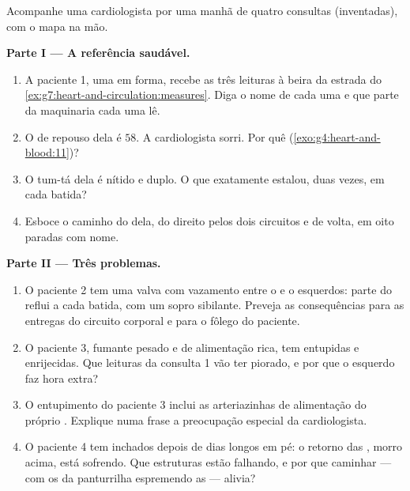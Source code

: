 \begin{problem}\label{pb:g7:heart-and-circulation:1}
Acompanhe uma cardiologista por uma manhã de quatro consultas
(inventadas), com o mapa na mão.

\medskip\noindent\textbf{Parte I --- A referência
saudável.}
\begin{enumerate}
  \item A paciente 1, uma  em forma, recebe as três
        leituras à beira da estrada do
        \cref{ex:g7:heart-and-circulation:measures}. Diga o nome de
        cada uma e que parte da maquinaria cada uma lê.
  \item O  de repouso dela é $58$. A cardiologista sorri. Por
        quê (\cref{exo:g4:heart-and-blood:11})?
  \item O tum-tá dela é nítido e duplo. O que exatamente estalou,
        duas vezes, em cada batida?
  \item Esboce o caminho do  dela, do  direito pelos dois
        circuitos e de volta, em oito paradas com nome.
\end{enumerate}

\medskip\noindent\textbf{Parte II --- Três problemas.}
\begin{enumerate}[resume]
  \item O paciente 2 tem uma valva com vazamento entre o  e o
         esquerdos: parte do  reflui a cada batida,
        com um sopro sibilante. Preveja as consequências para as
        entregas do circuito corporal e para o fôlego do paciente.
  \item O paciente 3, fumante pesado e de alimentação rica, tem
         entupidas e enrijecidas. Que leituras da consulta 1
        vão ter piorado, e por que o  esquerdo faz hora
        extra?
  \item O entupimento do paciente 3 inclui as arteriazinhas de
        alimentação do próprio . Explique numa frase a
        preocupação especial da cardiologista.
  \item O paciente 4 tem  inchados depois de dias longos em
        pé: o retorno das , morro acima, está sofrendo. Que
        estruturas estão falhando, e por que caminhar --- com os
         da panturrilha espremendo as  --- alivia?
\end{enumerate}


\end{problem}
